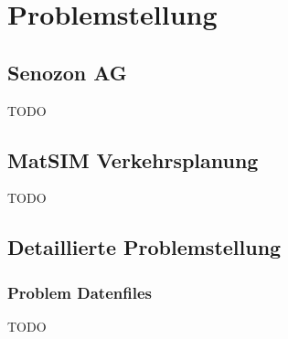 \chapter{Problemstellung}

\section{Senozon AG}
\begin{flushleft}
TODO
\end{flushleft}
\section{MatSIM Verkehrsplanung}
\begin{flushleft}
TODO
\end{flushleft}
\section{Detaillierte Problemstellung}
\subsection{Problem Datenfiles}
\begin{flushleft}
TODO
\end{flushleft}


